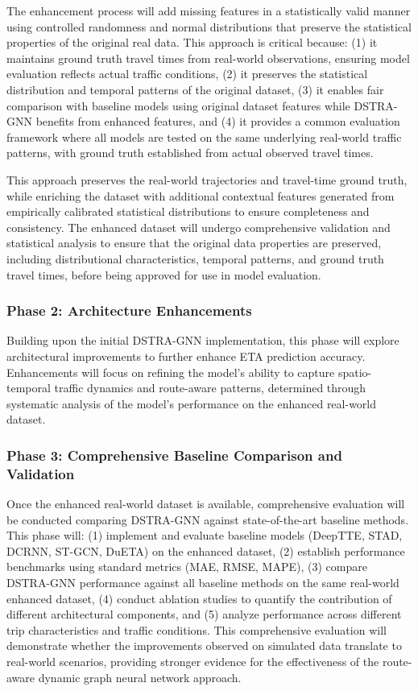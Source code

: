 The enhancement process will add missing features in a statistically valid manner using controlled randomness and normal distributions that preserve the statistical properties of the original real data. This approach is critical because: (1) it maintains ground truth travel times from real-world observations, ensuring model evaluation reflects actual traffic conditions, (2) it preserves the statistical distribution and temporal patterns of the original dataset, (3) it enables fair comparison with baseline models using original dataset features while DSTRA-GNN benefits from enhanced features, and (4) it provides a common evaluation framework where all models are tested on the same underlying real-world traffic patterns, with ground truth established from actual observed travel times.

This approach preserves the real-world trajectories and travel-time ground truth, while enriching the dataset with additional contextual features generated from empirically calibrated statistical distributions to ensure completeness and consistency. The enhanced dataset will undergo comprehensive validation and statistical analysis to ensure that the original data properties are preserved, including distributional characteristics, temporal patterns, and ground truth travel times, before being approved for use in model evaluation.

\subsubsection{Phase 2: Architecture Enhancements}

Building upon the initial DSTRA-GNN implementation, this phase will explore architectural improvements to further enhance ETA prediction accuracy. Enhancements will focus on refining the model's ability to capture spatio-temporal traffic dynamics and route-aware patterns, determined through systematic analysis of the model's performance on the enhanced real-world dataset.

\subsubsection{Phase 3: Comprehensive Baseline Comparison and Validation}

Once the enhanced real-world dataset is available, comprehensive evaluation will be conducted comparing DSTRA-GNN against state-of-the-art baseline methods. This phase will: (1) implement and evaluate baseline models (DeepTTE, STAD, DCRNN, ST-GCN, DuETA) on the enhanced dataset, (2) establish performance benchmarks using standard metrics (MAE, RMSE, MAPE), (3) compare DSTRA-GNN performance against all baseline methods on the same real-world enhanced dataset, (4) conduct ablation studies to quantify the contribution of different architectural components, and (5) analyze performance across different trip characteristics and traffic conditions. This comprehensive evaluation will demonstrate whether the improvements observed on simulated data translate to real-world scenarios, providing stronger evidence for the effectiveness of the route-aware dynamic graph neural network approach.

